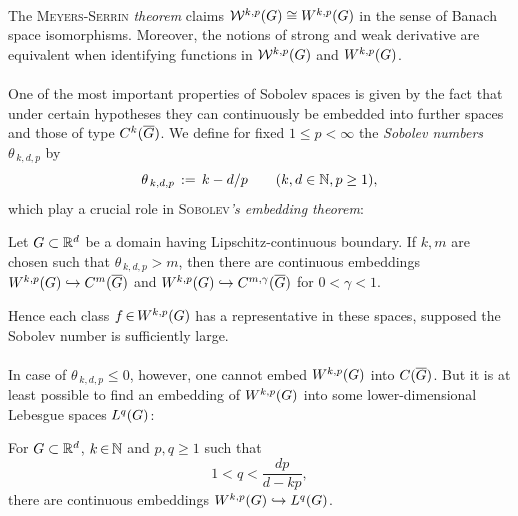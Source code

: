\documentclass[11pt,twoside]{article}
\begin{document}
\begin{itemize}[leftmargin=12pt,itemsep=5pt]
\begin{itemize}[leftmargin=17pt]
\paragraph{} %
The \textsc{Meyers-Serrin} \textit{theorem} claims
${\mathcal{W}}^{k,p}(G) \cong W^{k,p}(G)$ in the sense of Banach space isomorphisms.
Moreover,
the notions of strong and weak derivative are equivalent
when identifying functions in ${\mathcal{W}}^{k,p}(G)$ and $W^{k,p}(G)$.

\paragraph{} %
One of the most important properties of Sobolev spaces is given by the fact
that under certain hypotheses they can continuously be embedded
into further spaces and those of type $C^k(\overline{G})$.
We define for fixed $1 \leq p < \infty$
the \textit{Sobolev numbers} $\theta_{\,k,d,p}$ by
\[
\theta_{\,k,d,p} \,:=\, k - d/p
\quad \quad (k,d \in {\mathbb{N}}, p \geq 1),
\]
which play a crucial role in \textsc{Sobolev}\textit{'s embedding theorem}:

\begin{theorem1}\label{I_SOBOLEV_EMBEDDING_THEOREM_1}
Let $G \subset {\mathbb{R}}^d$ be a domain having Lipschitz-continuous boundary.
If $k,m$ are chosen such that $\theta_{\,k,d,p} > m$,
then there are continuous embeddings
$W^{k,p}(G) \hookrightarrow C^m(\overline{G})$ and
$W^{k,p}(G) \hookrightarrow C^{m,\gamma}(\overline{G})$ for $0 < \gamma < 1$.
\end{theorem1}

Hence each class $f {\,\in\,} W^{k,p}(G)$ has a representative in these spaces,
supposed the Sobolev number is sufficiently large.

\paragraph{} %
In case of $\theta_{\,k,d,p} \leq 0$,
however,
one cannot embed $W^{k,p}(G)$ into $C(\overline{G})$.
But it is at least possible to find an embedding of $W^{k,p}(G)$
into some lower-dimensional Lebesgue spaces $L^q(G)$:

\begin{theorem1}\label{I_SOBOLEV_EMBEDDING_THEOREM_2}
For $G \subset {\mathbb{R}}^d$,
$k {\,\in\,} {\mathbb{N}}$ and $p,q \geq 1$ such that
\[
1 < q < \frac{dp}{d-kp},
\]
there are continuous embeddings $W^{k,p}(G) \hookrightarrow L^q(G)$.
\end{theorem1}


\end{itemize}
\end{itemize}
\end{document}
